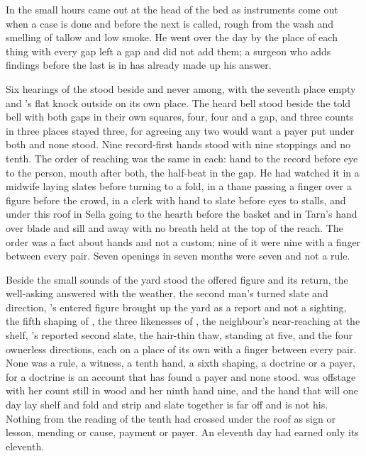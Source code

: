 In the small hours  came out at the head of the bed as instruments come out when a case is done and before the next is called, rough from the wash and smelling of tallow and low smoke. He went over the day by the place of each thing with every gap left a gap and did not add them; a surgeon who adds findings before the last is in has already made up his answer.

Six hearings of the  stood beside and never among, with the seventh place empty and 's flat knock outside on its own place. The heard bell stood beside the told bell with both gaps in their own squares, four, four and a gap, and three counts in three places stayed three, for agreeing any two would want a payer put under both and none stood. Nine record-first hands stood with nine stoppings and no tenth. The order of reaching was the same in each: hand to the record before eye to the person, mouth after both, the half-beat in the gap. He had watched it in a midwife laying slates before turning to a fold, in a thane passing a finger over a figure before the crowd, in a clerk with hand to slate before eyes to stalls, and under this roof in Sella going to the hearth before the basket and in Tarn's hand over blade and sill and away with no breath held at the top of the reach. The order was a fact about hands and not a custom; nine of it were nine with a finger between every pair. Seven openings in seven months were seven and not a rule.

Beside the small sounds of the yard stood the offered figure and its return, the well-asking answered with the weather, the second man's turned slate and direction, 's entered figure brought up the yard as a report and not a sighting, the fifth shaping of , the three likenesses of , the neighbour's near-reaching at the shelf, 's reported second slate, the hair-thin thaw,  standing at five, and the four ownerless directions, each on a place of its own with a finger between every pair. None was a rule, a witness, a tenth hand, a sixth shaping, a doctrine or a payer, for a doctrine is an account that has found a payer and none stood.  was offstage with her count still in wood and her ninth hand nine, and the hand that will one day lay shelf and fold and strip and slate together is far off and is not his. Nothing from the reading of the tenth had crossed under the roof as sign or lesson, mending or cause, payment or payer. An eleventh day had earned only its eleventh.


